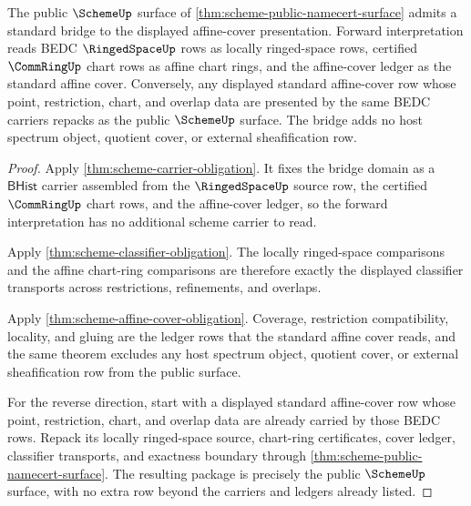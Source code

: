 \begin{theorem}\label{thm:scheme-public-standard-bridge}
The public $\SchemeUp$ surface of \autoref{thm:scheme-public-namecert-surface} admits a standard bridge to the displayed affine-cover presentation. Forward interpretation reads BEDC $\RingedSpaceUp$ rows as locally ringed-space rows, certified $\CommRingUp$ chart rows as affine chart rings, and the affine-cover ledger as the standard affine cover. Conversely, any displayed standard affine-cover row whose point, restriction, chart, and overlap data are presented by the same BEDC carriers repacks as the public $\SchemeUp$ surface. The bridge adds no host spectrum object, quotient cover, or external sheafification row.
\end{theorem}
\begin{proof}
Apply \autoref{thm:scheme-carrier-obligation}. It fixes the bridge domain as a $\mathsf{BHist}$ carrier assembled from the $\RingedSpaceUp$ source row, the certified $\CommRingUp$ chart rows, and the affine-cover ledger, so the forward interpretation has no additional scheme carrier to read.

Apply \autoref{thm:scheme-classifier-obligation}. The locally ringed-space comparisons and the affine chart-ring comparisons are therefore exactly the displayed classifier transports across restrictions, refinements, and overlaps.

Apply \autoref{thm:scheme-affine-cover-obligation}. Coverage, restriction compatibility, locality, and gluing are the ledger rows that the standard affine cover reads, and the same theorem excludes any host spectrum object, quotient cover, or external sheafification row from the public surface.

For the reverse direction, start with a displayed standard affine-cover row whose point, restriction, chart, and overlap data are already carried by those BEDC rows. Repack its locally ringed-space source, chart-ring certificates, cover ledger, classifier transports, and exactness boundary through \autoref{thm:scheme-public-namecert-surface}. The resulting package is precisely the public $\SchemeUp$ surface, with no extra row beyond the carriers and ledgers already listed.
\end{proof}

